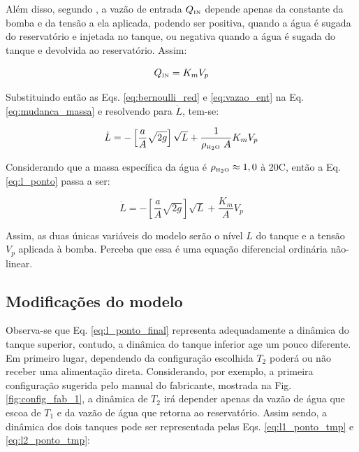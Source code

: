 Além disso, segundo , a vazão de entrada
$Q_{\text{\tiny IN}}$ depende apenas da constante da bomba e da tensão a ela
aplicada, podendo ser positiva, quando a água é sugada do reservatório e
injetada no tanque, ou negativa quando a água é sugada do tanque e devolvida ao
reservatório. Assim:

\begin{equation}\label{eq:vazao_ent}
Q_{\text{\tiny IN}} = K_mV_p
\end{equation}

Substituindo então as Eqs. \ref{eq:bernoulli_red} e \ref{eq:vazao_ent} na Eq.
\ref{eq:mudanca_massa} e resolvendo para $\dot{L}$, tem-se:

\begin{equation}\label{eq:l_ponto}
\dot{L} = -\left[\frac{a}{A}\sqrt{2g}\right]\sqrt{L} + 
          \frac{1}{\rho_{\tiny \text{\tiny H}_2\text{\tiny O}}\ A}K_mV_p
\end{equation}

Considerando que a massa específica da água é $\rho_{\tiny \text{\tiny H}_2\text{\tiny O}} \approx 1,0$ à
20\textdegree C, então a Eq. \ref{eq:l_ponto} passa a ser:

\begin{equation}\label{eq:l_ponto_final}
\dot{L} = -\left[\frac{a}{A}\sqrt{2g}\right]\sqrt{L} + 
          \frac{K_m}{A}V_p
\end{equation}

Assim, as duas únicas variáveis do modelo serão o nível $L$ do tanque e a tensão
$V_p$ aplicada à bomba. Perceba que essa é uma equação diferencial ordinária
não-linear.

\subsection{Modificações do modelo}
Observa-se que Eq. \ref{eq:l_ponto_final} representa adequadamente a dinâmica do
tanque superior, contudo, a dinâmica do tanque inferior age um pouco diferente.
Em primeiro lugar, dependendo da configuração escolhida $T_2$ poderá ou não
receber uma alimentação direta. Considerando, por exemplo, a primeira
configuração sugerida pelo manual do fabricante, mostrada na Fig.
\ref{fig:config_fab_1}, a dinâmica de $T_2$ irá depender apenas da vazão de água
que escoa de $T_1$ e da vazão de água que retorna ao reservatório. Assim sendo,
a dinâmica dos dois tanques pode ser representada pelas Eqs.
\ref{eq:l1_ponto_tmp} e \ref{eq:l2_ponto_tmp}:

